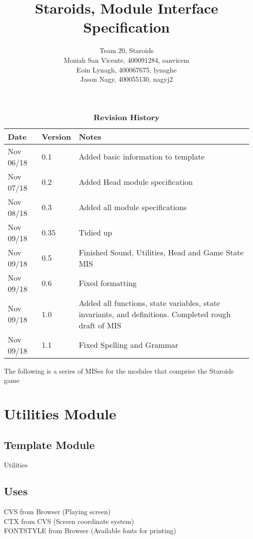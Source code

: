 \documentclass[12pt]{article}
\title{Staroids, Module Interface Specification}
\author{Team 20, Staroids
  \\ Moziah San Vicente, 400091284, sanvicem
  \\ Eoin Lynagh, 400067675, lynaghe
  \\ Jason Nagy, 400055130, nagyj2
}
\begin{document}
\maketitle

\begin{table}[bp]
\caption{\bf Revision History}
\begin{tabularx}{\textwidth}{p{3cm}p{2cm}X}
\toprule {\bf Date} & {\bf Version} & {\bf Notes}\\
\midrule
Nov 06/18 & 0.1 & Added basic information to template\\
Nov 07/18 & 0.2 & Added Head module specification\\
Nov 08/18 & 0.3 & Added all module specifications\\
Nov 09/18 & 0.35 & Tidied up\\
Nov 09/18 & 0.5 & Finished Sound, Utilities, Head and Game State MIS\\
Nov 09/18 & 0.6 & Fixed formatting\\
Nov 09/18 & 1.0 & Added all functions, state variables, state invariants, and definitions. Completed rough draft of MIS\\
Nov 09/18 & 1.1 & Fixed Spelling and Grammar\\
\bottomrule
\end{tabularx}
\end{table}

The following is a series of MISes for the modules that comprise the Staroids game

\newpage

\section*{Utilities Module}

\subsection*{Template Module}

Utilities

\subsection*{Uses}

CVS from Browser (Playing screen)\\
CTX from CVS (Screen coordinate system)\\
FONTSTYLE from Browser (Available fonts for printing)\\
\end{document}
